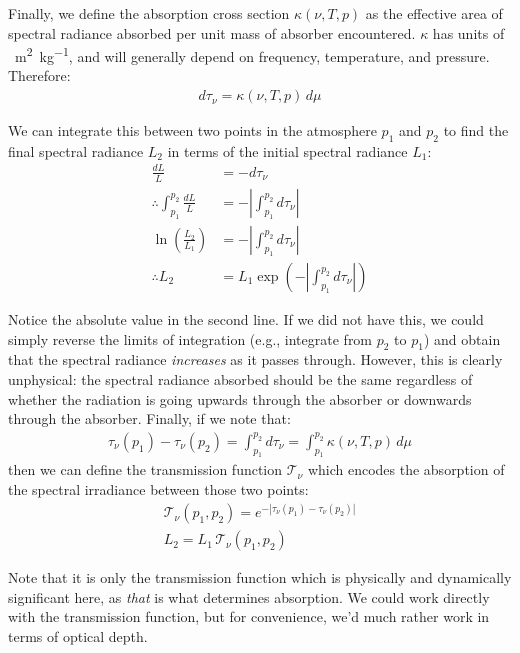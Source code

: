 Finally, we define the absorption cross section $\kappa(\nu,T,p)$ as the effective area of spectral radiance absorbed per unit mass of absorber encountered. $\kappa$ has units of \qty{}{\metre\squared\per\kilogram}, and will generally depend on frequency, temperature, and pressure. Therefore: 
\begin{align}
    \boxed{d\tau_\nu=\kappa(\nu,T,p)\,d\mu}
    \label{Optical Thickness}
\end{align}

We can integrate this between two points in the atmosphere $p_1$ and $p_2$ to find the final spectral radiance $L_{2}$ in terms of the initial spectral radiance $L_{1}$:
\begin{align*}
    \frac{dL}{L}&=-d\tau_\nu\\
    \therefore\int_{p_1}^{p_2}\frac{dL}{L}&=-\left|\int_{p_1}^{p_2}d\tau_\nu\right|\\
    \ln\left( \frac{L_2}{L_1} \right)&=-\left|\int_{p_1}^{p_2}d\tau_\nu\right|\\
    \therefore L_2&=L_1\exp\left(-\left|\int_{p_1}^{p_2}d\tau_\nu \right|\right)
\end{align*}

Notice the absolute value in the second line. If we did not have this, we could simply reverse the limits of integration (e.g., integrate from $p_2$ to $p_1$) and obtain that the spectral radiance \textit{increases} as it passes through. However, this is clearly unphysical: the spectral radiance absorbed should be the same regardless of whether the radiation is going upwards through the absorber or downwards through the absorber. Finally, if we note that:
\begin{align*}
    \tau_\nu(p_1)-\tau_\nu(p_2)=\int_{p_1}^{p_2}d\tau_\nu=\int_{p_1}^{p_2}\kappa(\nu,T,p)\,d\mu
\end{align*}
then we can define the transmission function $\mathcal{T}_\nu$ which encodes the absorption of the spectral irradiance between those two points:
\begin{align}
    \label{Absorption}
    \mathcal{T}_\nu(p_1,p_2)=e^{-|\tau_\nu(p_1)-\tau_\nu(p_2)|}
    \\
    L_2=L_1\,\mathcal{T}_\nu(p_1,p_2)\nonumber
\end{align}

Note that it is only the transmission function which is physically and dynamically significant here, as \textit{that} is what determines absorption. We could work directly with the transmission function, but for convenience, we'd much rather work in terms of optical depth.

